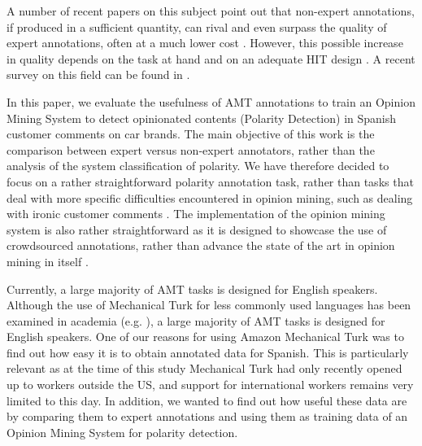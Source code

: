 \documentclass[11pt]{elsarticle}
\begin{document}
A number of recent papers on this subject point out that non-expert annotations, if produced in a sufficient quantity, can rival and even surpass the quality of expert annotations, often at a much lower cost \cite{callisonburch-dredze:2010:MTURK, snow_cheap_2008, su_internet-scale_2007}. However, this possible increase in quality depends on the task at hand and on an adequate HIT design \cite{kittur_crowdsourcing_2008}. A recent survey on this field can be found in \cite{YuenKL11}.

In this paper, we evaluate the usefulness of AMT annotations to train an Opinion Mining System to detect opinionated contents (Polarity Detection) in Spanish customer comments on car brands.  The main objective of this work is the comparison between expert versus non-expert annotators, rather than the analysis of the system classification of polarity. We have therefore decided to focus on a rather straightforward polarity annotation task, rather than tasks that deal with more specific difficulties encountered in opinion mining, such as dealing with ironic customer comments \cite{Reyes:2012,Filatova:2012,Bonev:2012}.
The implementation of the opinion mining system is also rather straightforward as it is designed to showcase the use of crowdsourced annotations, rather than advance the state of the art in opinion mining in itself \cite{Pang+Lee:08b}.

Currently, a large majority of AMT tasks is designed for English speakers. Although the use of Mechanical Turk for less commonly used languages has been examined in academia (e.g. \cite{irvine-klementiev:2010:MTURK}), a large majority of AMT tasks is designed for English speakers. One of our reasons for using Amazon Mechanical Turk was to find out how easy it is to obtain annotated data for Spanish. This is particularly relevant as at the time of this study Mechanical Turk had only recently opened up to workers outside the US, and support for international workers remains very limited to this day. In addition, we wanted to find out how useful these data are by comparing them to expert annotations and using them as training data of an Opinion Mining System for polarity detection.
\end{document}
